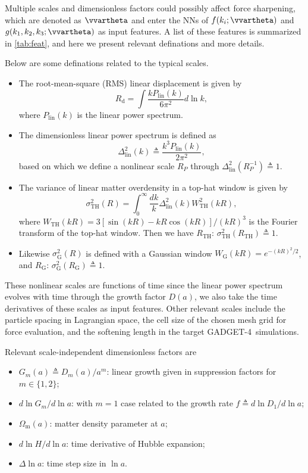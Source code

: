 \documentclass[modern, trackchanges, dvipsnames]{aastex631}
\newcommand{\GADGET}{{{\fontsize{10pt}{12pt}\selectfont GADGET}-4}}
\renewcommand{\d}{d}
\newcommand{\lna}{\ln\!a}
\newcommand{\lnk}{\ln\!k}
\newcommand{\Omegam}{\Omega_\mathrm{m}}
\newcommand{\linear}{\mathrm{lin}}
\newcommand{\tophat}{\mathrm{TH}}
\newcommand{\gauss}{\mathrm{G}}
\begin{document}
Multiple scales and dimensionless factors could possibly affect force
sharpening, which are denoted as $\vvartheta$ and enter the NNs of $f(k_i;
\vvartheta)$ and $g(k_1, k_2, k_3; \vvartheta)$ as input features.
A list of these features is summarized in \autoref{tab:feat}, and here we
present relevant definations and more details.

Below are some definations related to the typical scales.
\begin{itemize}
\item The root-mean-square (RMS) linear displacement is given by
%
\begin{equation}
R_\mathrm{d} = \int \frac{k P_\linear(k)}{6\pi^2} \d\lnk,
\end{equation}
%
where $P_\linear(k)$ is the linear power spectrum.
\item The dimensionless linear power spectrum is defined as
%
\begin{equation}
\Delta^2_\linear(k) \triangleq \frac{k^3 P_\linear(k)}{2 \pi^2},
\end{equation}
%
based on which we define a nonlinear scale $R_P$ through
$\Delta_\linear^2(R_P^{-1}) \triangleq 1$.
\item The variance of linear matter overdensity in a top-hat window is given by
%
\begin{equation}
\sigma_\tophat^2(R) = \int_0^\infty \frac{\d k}k
  \Delta_\linear^2(k) W_\tophat^2(kR),
\end{equation}
%
where $W_\tophat(kR) = 3[\sin(kR) - kR\cos(kR)] / (kR)^3$ is the
Fourier transform of the top-hat window.
Then we have $R_\tophat$: $\sigma_\tophat^2(R_\tophat) \triangleq 1$.
\item Likewise $\sigma_\gauss^2(R)$ is defined with a Gaussian window
$W_\gauss(kR) = e^{-(kR)^2/2}$, and $R_\gauss$: $\sigma_\gauss^2(R_\gauss)
\triangleq 1$.
\end{itemize}
These nonlinear scales are functions of time since the linear power spectrum
evolves with time through the growth factor $D(a)$, we also take the time
derivatives of these scales as input features.
Other relevant scales include the particle spacing in Lagrangian space, the cell
size of the chosen mesh grid for force evaluation, and the softening length in
the target \GADGET\ simulations.

Relevant scale-independent dimensionless factors are
\begin{itemize}
\item $G_m(a) \triangleq D_m(a) / a^m$: linear growth given in
  suppression factors for $m \in \{1, 2\}$;
\item $\d\ln G_m / \d\lna$: with $m=1$ case related to the growth rate
  $f \triangleq \d\ln D_1 / \d\lna$;
\item $\Omegam(a)$: matter density parameter at $a$;
\item $\d\ln\!H / \d\lna$: time derivative of Hubble expansion;
\item $\Delta\lna$: time step size in $\lna$.
\end{itemize}
\end{document}
